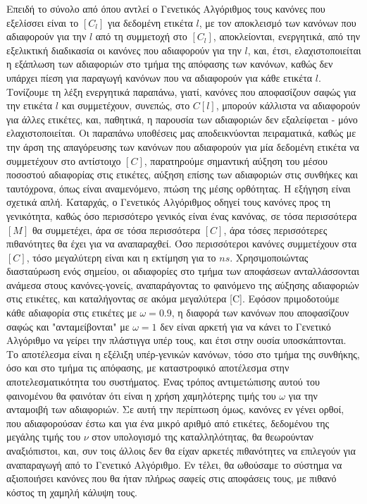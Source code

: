 Επειδή το σύνολο από όπου αντλεί ο Γενετικός Αλγόριθμος τους κανόνες που εξελίσσει είναι το $[C_{l}]$ για δεδομένη ετικέτα $l$, με τον αποκλεισμό των κανόνων που αδιαφορούν για την $l$ από τη συμμετοχή στο $[C_{l}]$, αποκλείονται, ενεργητικά, από την εξελικτική διαδικασία οι κανόνες που αδιαφορούν για την $l$, και, έτσι, ελαχιστοποιείται η εξάπλωση των αδιαφοριών στο τμήμα της απόφασης των κανόνων, καθώς δεν υπάρχει πίεση για παραγωγή κανόνων που να αδιαφορούν για κάθε ετικέτα $l$. Τονίζουμε τη λέξη ενεργητικά παραπάνω, γιατί, κανόνες που αποφασίζουν σαφώς για την ετικέτα $l$ και συμμετέχουν, συνεπώς, στο $C[l]$, μπορούν κάλλιστα να αδιαφορούν για άλλες ετικέτες, και, παθητικά, η παρουσία των αδιαφοριών δεν εξαλείφεται - μόνο ελαχιστοποιείται. Οι παραπάνω υποθέσεις μας αποδεικνύονται πειραματικά, καθώς με την άρση της απαγόρευσης των κανόνων που αδιαφορούν για μία δεδομένη ετικέτα να συμμετέχουν στο αντίστοιχο $[C]$, παρατηρούμε σημαντική αύξηση του μέσου ποσοστού αδιαφορίας στις ετικέτες, αύξηση επίσης των αδιαφοριών στις συνθήκες και ταυτόχρονα, όπως είναι αναμενόμενο, πτώση της μέσης ορθότητας. Η εξήγηση είναι σχετικά απλή. Καταρχάς, ο Γενετικός Αλγόριθμος οδηγεί τους κανόνες προς τη γενικότητα, καθώς όσο περισσότερο γενικός είναι ένας κανόνας, σε τόσα περισσότερα $[M]$ θα συμμετέχει, άρα σε τόσα περισσότερα $[C]$, άρα τόσες περισσότερες πιθανότητες θα έχει για να αναπαραχθεί. Όσο περισσότεροι κανόνες συμμετέχουν στα $[C]$, τόσο μεγαλύτερη είναι και η εκτίμηση για το $ns$. Χρησιμοποιώντας διασταύρωση ενός σημείου, οι αδιαφορίες στο τμήμα των αποφάσεων ανταλλάσσονται ανάμεσα στους κανόνες-γονείς, αναπαράγοντας το φαινόμενο της αύξησης αδιαφοριών στις ετικέτες, και καταλήγοντας σε ακόμα μεγαλύτερα [C]. Εφόσον πριμοδοτούμε κάθε αδιαφορία στις ετικέτες με $\omega = 0.9$, η διαφορά των κανόνων που αποφασίζουν σαφώς και "ανταμείβονται" με $\omega = 1$ δεν είναι αρκετή για να κάνει το Γενετικό Αλγόριθμο να γείρει την πλάστιγγα υπέρ τους, και έτσι στην ουσία υποσκάπτονται. Το αποτέλεσμα είναι η εξέλιξη υπέρ-γενικών κανόνων, τόσο στο τμήμα της συνθήκης, όσο και στο τμήμα τις απόφασης, με καταστροφικό αποτέλεσμα στην αποτελεσματικότητα του συστήματος. Ένας τρόπος αντιμετώπισης αυτού του φαινομένου θα φαινόταν ότι είναι η χρήση χαμηλότερης τιμής του $\omega$ για την ανταμοιβή των αδιαφοριών. Σε αυτή την περίπτωση όμως, κανόνες εν γένει ορθοί, που αδιαφορούσαν έστω και για ένα μικρό αριθμό από ετικέτες, δεδομένου της μεγάλης τιμής του $\nu$ στον υπολογισμό της καταλληλότητας, θα θεωρούνταν αναξιόπιστοι, και, συν τοις άλλοις δεν θα είχαν αρκετές πιθανότητες να επιλεγούν για αναπαραγωγή από το Γενετικό Αλγόριθμο. Εν τέλει, θα ωθούσαμε το σύστημα να αξιοποιήσει κανόνες που θα ήταν πλήρως σαφείς στις αποφάσεις τους, με πιθανό κόστος τη χαμηλή κάλυψη τους.

